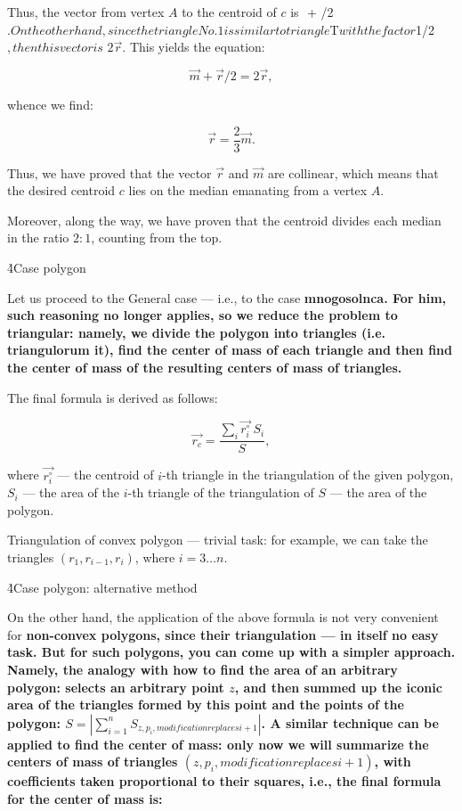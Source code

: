 
Thus, the vector from vertex $A$ to the centroid of $c$ is $ $ + /2$. On the other hand, since the triangle No. 1 is similar to triangle $T$ with the factor $1/2$, then this vector is $ $2 \vec{r}$. This yields the equation:

$$ \vec{m} + \vec{r}/2 = 2 \vec{r}, $$

whence we find:

$$ \vec{r} = \frac{2}{3} \vec{m}. $$

Thus, we have proved that the vector $\vec{r}$ and $\vec{m}$ are collinear, which means that the desired centroid $c$ lies on the median emanating from a vertex $A$.

Moreover, along the way, we have proven that the centroid divides each median in the ratio $2:1$, counting from the top.



\h4{Case polygon}

Let us proceed to the General case --- i.e., to the case \bf{mnogosolnca}. For him, such reasoning no longer applies, so we reduce the problem to triangular: namely, we divide the polygon into triangles (i.e. triangulorum it), find the center of mass of each triangle and then find the center of mass of the resulting centers of mass of triangles.

The final formula is derived as follows:

$$ \vec{r_c} = \frac{ \sum\limits_i \vec{r_i^\circ} ~ S_i }{ S }, $$

where $\vec{r_i^\circ}$ --- the centroid of $i$-th triangle in the triangulation of the given polygon, $S_i$ --- the area of the $i$-th triangle of the triangulation of $S$ --- the area of the polygon.

Triangulation of convex polygon --- trivial task: for example, we can take the triangles $(r_1,r_{i-1},r_i)$, where $i = 3 \ldots n$.

\h4{Case polygon: alternative method}

On the other hand, the application of the above formula is not very convenient for \bf{non-convex polygons}, since their triangulation --- in itself no easy task. But for such polygons, you can come up with a simpler approach. Namely, the analogy with how to find the area of an arbitrary polygon: selects an arbitrary point $z$, and then summed up the iconic area of the triangles formed by this point and the points of the polygon: $S = |\sum_{i=1}^n S_{z,p_i,modification replaces{i+1}}|$. A similar technique can be applied to find the center of mass: only now we will summarize the centers of mass of triangles $(z,p_i,modification replaces{i+1})$, with coefficients taken proportional to their squares, i.e., the final formula for the center of mass is:

